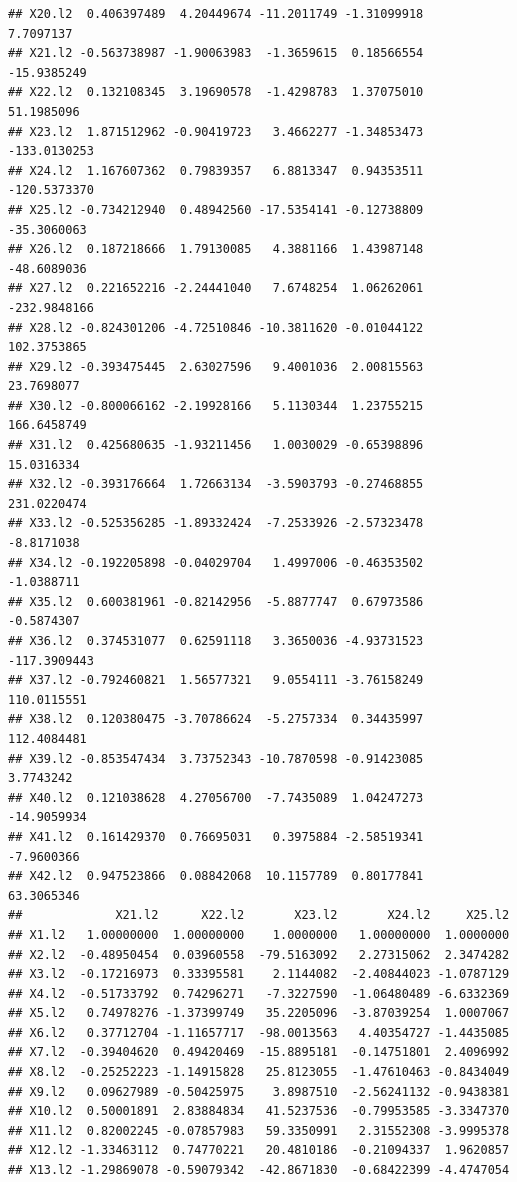 \documentclass[]{article}
\begin{document}
\begin{verbatim}
## X20.l2  0.406397489  4.20449674 -11.2011749 -1.31099918    7.7097137
## X21.l2 -0.563738987 -1.90063983  -1.3659615  0.18566554  -15.9385249
## X22.l2  0.132108345  3.19690578  -1.4298783  1.37075010   51.1985096
## X23.l2  1.871512962 -0.90419723   3.4662277 -1.34853473 -133.0130253
## X24.l2  1.167607362  0.79839357   6.8813347  0.94353511 -120.5373370
## X25.l2 -0.734212940  0.48942560 -17.5354141 -0.12738809  -35.3060063
## X26.l2  0.187218666  1.79130085   4.3881166  1.43987148  -48.6089036
## X27.l2  0.221652216 -2.24441040   7.6748254  1.06262061 -232.9848166
## X28.l2 -0.824301206 -4.72510846 -10.3811620 -0.01044122  102.3753865
## X29.l2 -0.393475445  2.63027596   9.4001036  2.00815563   23.7698077
## X30.l2 -0.800066162 -2.19928166   5.1130344  1.23755215  166.6458749
## X31.l2  0.425680635 -1.93211456   1.0030029 -0.65398896   15.0316334
## X32.l2 -0.393176664  1.72663134  -3.5903793 -0.27468855  231.0220474
## X33.l2 -0.525356285 -1.89332424  -7.2533926 -2.57323478   -8.8171038
## X34.l2 -0.192205898 -0.04029704   1.4997006 -0.46353502   -1.0388711
## X35.l2  0.600381961 -0.82142956  -5.8877747  0.67973586   -0.5874307
## X36.l2  0.374531077  0.62591118   3.3650036 -4.93731523 -117.3909443
## X37.l2 -0.792460821  1.56577321   9.0554111 -3.76158249  110.0115551
## X38.l2  0.120380475 -3.70786624  -5.2757334  0.34435997  112.4084481
## X39.l2 -0.853547434  3.73752343 -10.7870598 -0.91423085    3.7743242
## X40.l2  0.121038628  4.27056700  -7.7435089  1.04247273  -14.9059934
## X41.l2  0.161429370  0.76695031   0.3975884 -2.58519341   -7.9600366
## X42.l2  0.947523866  0.08842068  10.1157789  0.80177841   63.3065346
##             X21.l2      X22.l2       X23.l2       X24.l2     X25.l2
## X1.l2   1.00000000  1.00000000    1.0000000   1.00000000  1.0000000
## X2.l2  -0.48950454  0.03960558  -79.5163092   2.27315062  2.3474282
## X3.l2  -0.17216973  0.33395581    2.1144082  -2.40844023 -1.0787129
## X4.l2  -0.51733792  0.74296271   -7.3227590  -1.06480489 -6.6332369
## X5.l2   0.74978276 -1.37399749   35.2205096  -3.87039254  1.0007067
## X6.l2   0.37712704 -1.11657717  -98.0013563   4.40354727 -1.4435085
## X7.l2  -0.39404620  0.49420469  -15.8895181  -0.14751801  2.4096992
## X8.l2  -0.25252223 -1.14915828   25.8123055  -1.47610463 -0.8434049
## X9.l2   0.09627989 -0.50425975    3.8987510  -2.56241132 -0.9438381
## X10.l2  0.50001891  2.83884834   41.5237536  -0.79953585 -3.3347370
## X11.l2  0.82002245 -0.07857983   59.3350991   2.31552308 -3.9995378
## X12.l2 -1.33463112  0.74770221   20.4810186  -0.21094337  1.9620857
## X13.l2 -1.29869078 -0.59079342  -42.8671830  -0.68422399 -4.4747054

\end{verbatim}
\end{document}
